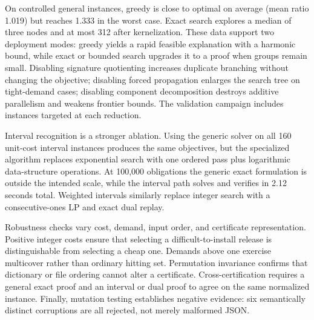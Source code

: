 \documentclass[10pt,conference]{IEEEtran}
\begin{document}
On controlled general instances, greedy is close to optimal on average (mean ratio 1.019) but reaches 1.333 in the worst case. Exact search explores a median of three nodes and at most 312 after kernelization. These data support two deployment modes: greedy yields a rapid feasible explanation with a harmonic bound, while exact or bounded search upgrades it to a proof when groups remain small. Disabling signature quotienting increases duplicate branching without changing the objective; disabling forced propagation enlarges the search tree on tight-demand cases; disabling component decomposition destroys additive parallelism and weakens frontier bounds. The validation campaign includes instances targeted at each reduction.

Interval recognition is a stronger ablation. Using the generic solver on all 160 unit-cost interval instances produces the same objectives, but the specialized algorithm replaces exponential search with one ordered pass plus logarithmic data-structure operations. At 100,000 obligations the generic exact formulation is outside the intended scale, while the interval path solves and verifies in 2.12 seconds total. Weighted intervals similarly replace integer search with a consecutive-ones LP and exact dual replay.

Robustness checks vary cost, demand, input order, and certificate representation. Positive integer costs ensure that selecting a difficult-to-install release is distinguishable from selecting a cheap one. Demands above one exercise multicover rather than ordinary hitting set. Permutation invariance confirms that dictionary or file ordering cannot alter a certificate. Cross-certification requires a general exact proof and an interval or dual proof to agree on the same normalized instance. Finally, mutation testing establishes negative evidence: six semantically distinct corruptions are all rejected, not merely malformed JSON.
\end{document}

